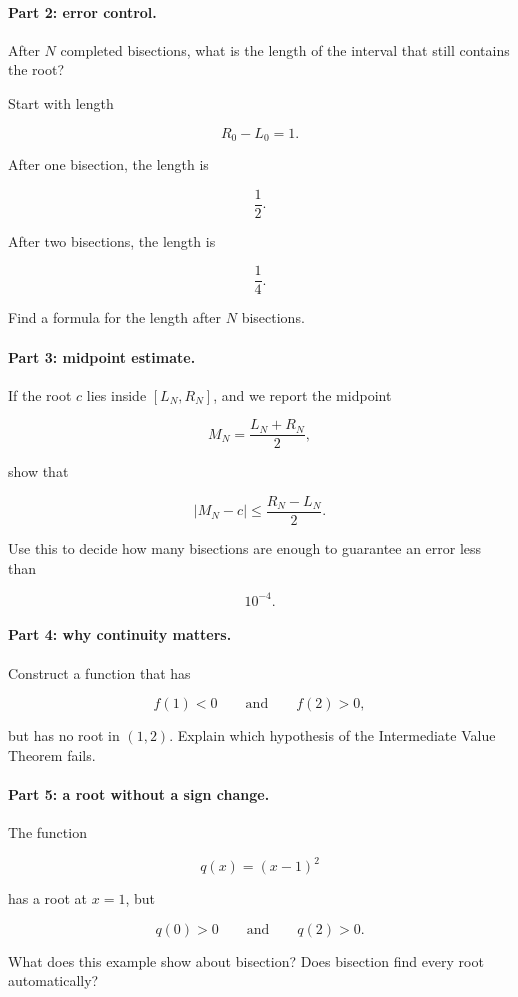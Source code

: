 \paragraph{Part 2: error control.}
After \(N\) completed bisections, what is the length of the interval that still contains the root?

Start with length

\[
R_0-L_0=1.
\]

After one bisection, the length is

\[
\frac12.
\]

After two bisections, the length is

\[
\frac14.
\]

Find a formula for the length after \(N\) bisections.

\paragraph{Part 3: midpoint estimate.}
If the root \(c\) lies inside \([L_N,R_N]\), and we report the midpoint

\[
M_N=\frac{L_N+R_N}{2},
\]

show that

\[
|M_N-c|\le \frac{R_N-L_N}{2}.
\]

Use this to decide how many bisections are enough to guarantee an error less than

\[
10^{-4}.
\]

\paragraph{Part 4: why continuity matters.}
Construct a function that has

\[
f(1)<0
\qquad\text{and}\qquad
f(2)>0,
\]

but has no root in \((1,2)\).  Explain which hypothesis of the Intermediate Value Theorem fails.

\paragraph{Part 5: a root without a sign change.}
The function

\[
q(x)=(x-1)^2
\]

has a root at \(x=1\), but

\[
q(0)>0
\qquad\text{and}\qquad
q(2)>0.
\]

What does this example show about bisection?  Does bisection find every root automatically?

